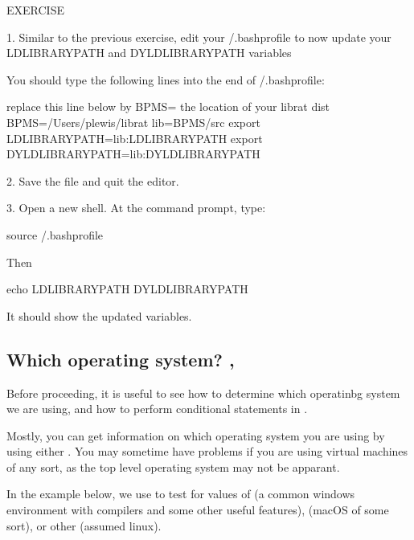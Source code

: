 \documentclass[letterpaper,10pt,english]{sphinxmanual}
\begin{document}
\begin{sphinxVerbatim}[commandchars=\\\{\}]
EXERCISE

    1. Similar to the previous exercise, edit your \PYGZti{}/.bash\PYGZus{}profile to now update your LD\PYGZus{}LIBRARY\PYGZus{}PATH and DYLD\PYGZus{}LIBRARY\PYGZus{}PATH variables

    You should type the following lines into the end of \PYGZti{}/.bash\PYGZus{}profile:

    \PYGZsh{} replace this line below by BPMS= the location of your librat dist
    BPMS=/Users/plewis/librat
    lib=\PYGZdl{}BPMS/src
    export LD\PYGZus{}LIBRARY\PYGZus{}PATH=\PYGZdq{}\PYGZdl{}lib:\PYGZdl{}LD\PYGZus{}LIBRARY\PYGZus{}PATH\PYGZdq{}
    export DYLD\PYGZus{}LIBRARY\PYGZus{}PATH=\PYGZdq{}\PYGZdl{}lib:\PYGZdl{}DYLD\PYGZus{}LIBRARY\PYGZus{}PATH\PYGZdq{}


    2. Save the file and quit the editor.

    3. Open a new shell. At the command prompt, type:

            source \PYGZti{}/.bash\PYGZus{}profile

    Then

            echo \PYGZdl{}LD\PYGZus{}LIBRARY\PYGZus{}PATH \PYGZdl{}DYLD\PYGZus{}LIBRARY\PYGZus{}PATH

    It should show the updated variables.
\end{sphinxVerbatim}


\subsection{Which operating system? , }
\label{\detokenize{Appendix1:Which-operating-system?-uname,-if}}
Before proceeding, it is useful to see how to determine which operatinbg system we are using, and how to perform conditional statements in .

Mostly, you can get information on which operating system you are using by using either . You may sometime have problems if you are using virtual machines of any sort, as the top level operating system may not be apparant.

In the example below, we use  to test for values of  (a common windows environment with compilers and some other useful features),  (macOS of some sort), or other (assumed linux).
\end{document}
